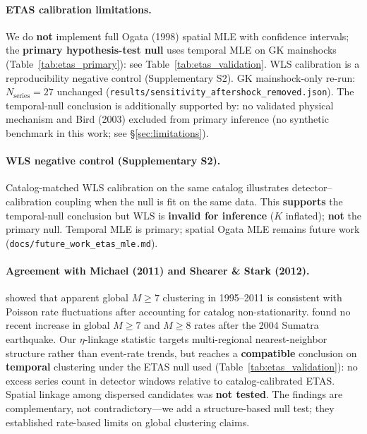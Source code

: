 \documentclass[draft]{agujournal2019}
\begin{document}
\paragraph{ETAS calibration limitations.}
\label{sec:etas-calib-limits}
We do \textbf{not} implement full Ogata (1998) spatial MLE with confidence
intervals; the \textbf{primary hypothesis-test null} uses temporal MLE on
GK mainshocks (Table~\ref{tab:etas_primary}): see Table~\ref{tab:etas_validation}.
WLS calibration is a reproducibility negative control
(Supplementary S2).
GK mainshock-only re-run: $N_\mathrm{series}=27$ unchanged
(\texttt{results/sensitivity\_aftershock\_removed.json}).
The temporal-null conclusion is additionally supported by: no validated physical
mechanism and Bird (2003) excluded from primary inference (no synthetic benchmark
in this work; see \S\ref{sec:limitations}).

\paragraph{WLS negative control (Supplementary S2).}
Catalog-matched WLS calibration on the same catalog illustrates
detector--calibration coupling when the null is fit on the same data.
This \textbf{supports} the temporal-null conclusion but WLS is
\textbf{invalid for inference} ($K$ inflated); \textbf{not} the primary null.
Temporal MLE is primary; spatial Ogata MLE remains future work
(\texttt{docs/future\_work\_etas\_mle.md}).

\paragraph{Agreement with Michael (2011) and Shearer \& Stark (2012).}
\citet{Michael2011} showed that apparent global $M \ge 7$ clustering in
1995--2011 is consistent with Poisson rate fluctuations after accounting for
catalog non-stationarity.
\citet{ShearerStark2012} found no recent increase in global $M \ge 7$ and
$M \ge 8$ rates after the 2004 Sumatra earthquake.
Our $\eta$-linkage statistic targets multi-regional nearest-neighbor structure
rather than event-rate trends, but reaches a \textbf{compatible} conclusion on
\textbf{temporal} clustering under the ETAS null used (Table~\ref{tab:etas_validation}):
no excess series count in detector windows relative to catalog-calibrated ETAS.
Spatial linkage among dispersed candidates was \textbf{not tested}.
The findings are complementary, not contradictory---we add a structure-based
null test; they established rate-based limits on global clustering claims.
\end{document}
